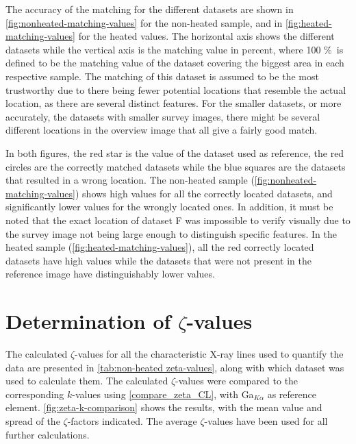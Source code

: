 The accuracy of the matching for the different datasets are shown in \cref{fig:nonheated-matching-values} for the non-heated sample, and in \cref{fig:heated-matching-values} for the heated values. The horizontal axis shows the different datasets while the vertical axis is the matching value in percent, where 100 \% is defined to be the matching value of the dataset covering the biggest area in each respective sample. The matching of this dataset is assumed to be the most trustworthy due to there being fewer potential locations that resemble the actual location, as there are several distinct features. For the smaller datasets, or more accurately, the datasets with smaller survey images, there might be several different locations in the overview image that all give a fairly good match.

In both figures, the red star is the value of the dataset used as reference, the red circles are the correctly matched datasets while the blue squares are the datasets that resulted in a wrong location. The non-heated sample (\cref{fig:nonheated-matching-values}) shows high values for all the correctly located datasets, and significantly lower values for the wrongly located ones. In addition, it must be noted that the exact location of dataset F was impossible to verify visually due to the survey image not being large enough to distinguish specific features. In the heated sample (\cref{fig:heated-matching-values}), all the red correctly located datasets have high values while the datasets that were not present in the reference image have distinguishably lower values.

\section{Determination of $\zeta$-values}

The calculated $\zeta$-values for all the characteristic X-ray lines used to quantify the data are presented in \cref{tab:non-heated zeta-values}, along with which dataset was used to calculate them. The calculated $\zeta$-values were compared to the corresponding $k$-values using \cref{compare_zeta_CL}, with Ga$_{K\alpha}$ as reference element. \cref{fig:zeta-k-comparison} shows the results, with the mean value and spread of the $\zeta$-factors indicated. The average $\zeta$-values have been used for all further calculations. 

